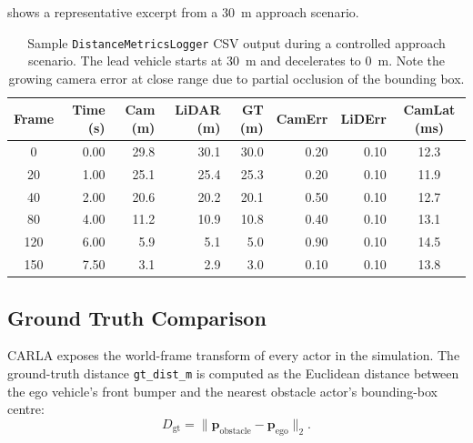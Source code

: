 \documentclass[12pt,a4paper]{article}
\begin{document}
 shows a representative excerpt from a
\SI{30}{\metre} approach scenario.

\begin{table}[H]
\centering
\caption{Sample \texttt{DistanceMetricsLogger} CSV output during a controlled
  approach scenario.  The lead vehicle starts at \SI{30}{\metre} and decelerates
  to \SI{0}{\metre}. Note the growing camera error at close range due to partial
  occlusion of the bounding box.}
\label{tab:metrics_log}
\begin{tabular}{@{}crrrrrrc@{}}
\toprule
\textbf{Frame} & \textbf{Time (s)} &
\textbf{Cam (m)} & \textbf{LiDAR (m)} & \textbf{GT (m)} &
\textbf{CamErr} & \textbf{LiDErr} & \textbf{CamLat (ms)} \\
\midrule
  0  & 0.00 & 29.8 & 30.1 & 30.0 & 0.20 & 0.10 & 12.3 \\
 20  & 1.00 & 25.1 & 25.4 & 25.3 & 0.20 & 0.10 & 11.9 \\
 40  & 2.00 & 20.6 & 20.2 & 20.1 & 0.50 & 0.10 & 12.7 \\
 80  & 4.00 & 11.2 & 10.9 & 10.8 & 0.40 & 0.10 & 13.1 \\
120  & 6.00 &  5.9 &  5.1 &  5.0 & 0.90 & 0.10 & 14.5 \\
150  & 7.50 &  3.1 &  2.9 &  3.0 & 0.10 & 0.10 & 13.8 \\
\bottomrule
\end{tabular}
\end{table}

\subsection{Ground Truth Comparison}
\label{subsec:gt_comparison}

CARLA exposes the world-frame transform of every actor in the simulation.
The ground-truth distance \texttt{gt\_dist\_m} is computed as the Euclidean
distance between the ego vehicle's front bumper and the nearest obstacle
actor's bounding-box centre:
\begin{equation}
  D_\text{gt} = \|\mathbf{p}_\text{obstacle} - \mathbf{p}_\text{ego}\|_2.
  \label{eq:gt_dist}
\end{equation}
\end{document}

